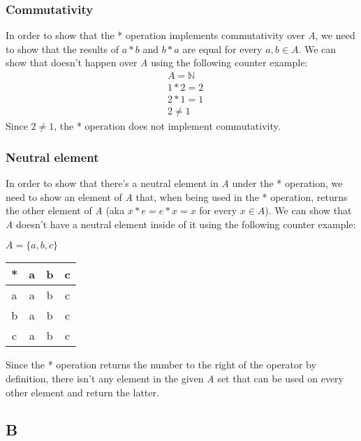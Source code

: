 \documentclass[12pt, oneside]{article}
\begin{document}
\subsubsection{Commutativity}
In order to show that the * operation implements commutativity over \emph{A}, we need to show that the results of $a * b$ and $b * a$ are equal for every $a, b \in A$. We can show that doesn't happen over \emph{A} using the following counter example:
\begin{equation*}
\begin{split}
& A = \mathbb{N}\\
& 1 * 2 = 2\\
& 2 * 1 = 1\\
& 2 \neq 1
\end{split}
\end{equation*}
Since $2 \neq 1$, the * operation does not implement commutativity.

\subsubsection{Neutral element}
In order to show that there's a neutral element in \emph{A} under the * operation, we need to show an element of \emph{A} that, when being used in the * operation, returns the other element of \emph{A} (aka $x * e = e * x = x$ for every $x \in A$). We can show that \emph{A} doesn't have a neutral element inside of it using the following counter example:
\begin{center}
$A = \{a, b, c\}$\\
\hfill\break
\begin{tabular}{c|c|c|c}
* & a & b & c\\
\hline
a & a & b & c\\
\hline
b & a & b & c\\
\hline
c & a & b & c
\end{tabular}
\end{center}
Since the * operation returns the number to the right of the operator by definition, there isn't any element in the given \emph{A} set that can be used on every other element and return the latter.
\clearpage

\subsection{B}
\end{document}

